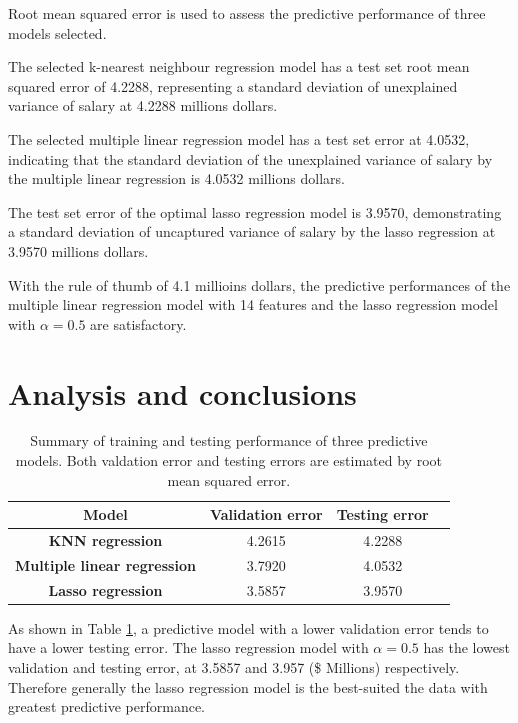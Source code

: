 \documentclass[letterpaper,12pt,twoside,]{pinp}
\begin{document}
Root mean squared error is used to assess the predictive performance of
three models selected.

The selected k-nearest neighbour regression model has a test set root
mean squared error of 4.2288, representing a standard deviation of
unexplained variance of salary at 4.2288 millions dollars.

The selected multiple linear regression model has a test set error at
4.0532, indicating that the standard deviation of the unexplained
variance of salary by the multiple linear regression is 4.0532 millions
dollars.

The test set error of the optimal lasso regression model is 3.9570,
demonstrating a standard deviation of uncaptured variance of salary by
the lasso regression at 3.9570 millions dollars.

With the rule of thumb of 4.1 millioins dollars, the predictive
performances of the multiple linear regression model with 14 features
and the lasso regression model with \(\alpha=0.5\) are satisfactory.

\hypertarget{analysis-and-conclusions}{%
\section{Analysis and conclusions}\label{analysis-and-conclusions}}

\begin{table}
\begin{tabular}{ |c|c|c|c| } 
\hline
\textbf{Model} & \textbf{Validation error} & \textbf{Testing error} \\
\hline
\textbf{KNN regression} & 4.2615 & 4.2288 \\ 
\textbf{Multiple linear regression} & 3.7920 & 4.0532 \\
\textbf{Lasso regression} & 3.5857 & 3.9570 \\
\hline
\end{tabular}
\centering
\caption{Summary of training and testing performance of three predictive models. Both valdation error and testing errors are estimated by root mean squared error.}
\label{table:errors}
\end{table}

As shown in Table \ref{table:errors}, a predictive model with a lower
validation error tends to have a lower testing error. The lasso
regression model with \(\alpha=0.5\) has the lowest validation and
testing error, at 3.5857 and 3.957 (\$ Millions) respectively. Therefore
generally the lasso regression model is the best-suited the data with
greatest predictive performance.
\end{document}
